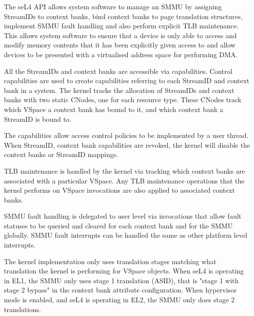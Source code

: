 The seL4 API allows system software to manage an SMMU by assigning StreamIDs to
context banks, bind context banks to page translation structures, implement
SMMU fault handling and also perform explicit TLB maintenance.
This allows system software to ensure that a device is only able to access and
modify memory contents that it has been explicitly given access to and allow
devices to be presented with a virtualised address space for performing DMA.

All the StreamIDs and context banks are accessible via capabilities. Control
capabilities are used to create capabilities referring to each StreamID and
context bank in a system. The kernel tracks the allocation of StreamIDs and
context banks with two static CNodes, one for each resource type. These CNodes
track which VSpace a context bank has bound to it, and which context bank a
StreamID is bound to.

The capabilities allow access control policies to be implemented by a user thread.
When StreamID, context bank capabilities are revoked, the kernel will disable
the context banks or StreamID mappings.

TLB maintenance is handled by the kernel via tracking which context banks are
associated with a particular VSpace. Any TLB maintenance operations that the
kernel performs on VSpace invocations are also applied to associated context
banks.

SMMU fault handling is delegated to user level via invocations that allow fault
statuses to be queried and cleared for each context bank and for the SMMU globally.
SMMU fault interrupts can be handled the same as other platform level interrupts.

The kernel implementation only uses translation stages matching what translation
the kernel is performing for VSpace objects. When seL4 is operating in EL1,
the SMMU only uses stage 1 translation (ASID), that is "stage 1 with stage 2
bypass" in the context bank attribute configuration. When hypervisor mode is
enabled, and seL4 is operating in EL2, the SMMU only does stage 2 translations.

